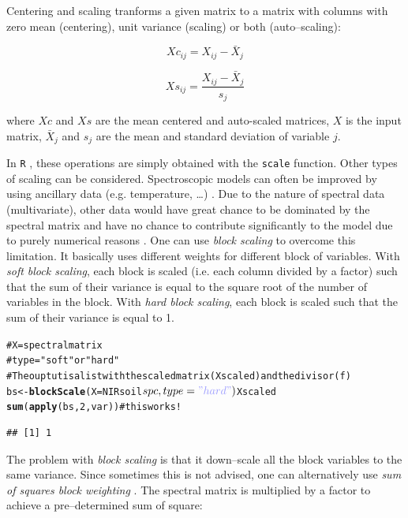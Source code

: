 \documentclass[12pt]{article}\usepackage{graphicx, color}
\makeatletter
\newcommand{\hlfunctioncall}[1]{\textcolor[rgb]{0.501960784313725,0,0.329411764705882}{\textbf{#1}}}%
\newcommand{\hlstring}[1]{\textcolor[rgb]{0.6,0.6,1}{#1}}%
\newcommand{\hlcomment}[1]{\textcolor[rgb]{0.180392156862745,0.6,0.341176470588235}{#1}}%
\newenvironment{kframe}{%
 \def\at@end@of@kframe{}%
 \ifinner\ifhmode%
  \def\at@end@of@kframe{\end{minipage}}%
  \begin{minipage}{\columnwidth}%
 \fi\fi%
 \def\FrameCommand##1{\hskip\@totalleftmargin \hskip-\fboxsep
 \colorbox{shadecolor}{##1}\hskip-\fboxsep
     \hskip-\linewidth \hskip-\@totalleftmargin \hskip\columnwidth}%
 \MakeFramed {\advance\hsize-\width
   \@totalleftmargin\z@ \linewidth\hsize
   \@setminipage}}%
 {\par\unskip\endMakeFramed%
 \at@end@of@kframe}
\newenvironment{knitrout}{}{} %
\newcommand{\R}{\texttt{R} }
\newcommand{\Rfunction}[1]{{\texttt{#1}}}
\makeatother
\begin{document}
Centering and scaling tranforms a given matrix to a matrix with columns with zero mean (centering), unit variance (scaling) or both (auto--scaling):

$$ Xc_{ij} = X_{ij}  - \bar{X}_{j} $$

$$ Xs_{ij} = \frac{X_{ij}  - \bar{X}_{j}}{s_{j}} $$

where $Xc$ and $Xs$ are the mean centered and auto-scaled matrices, $X$ is the input matrix, $\bar{X}_{j}$ and $s_{j}$ are the mean and standard deviation of variable $j$.

In \R, these operations are simply obtained with the \Rfunction{scale} function. Other types of scaling can be considered.  Spectroscopic models can often be improved by using ancillary data (e.g. temperature, \dots) \cite{fearn2010}. Due to the nature of spectral data (multivariate), other data would have great chance to be dominated by the spectral matrix and have no chance to contribute significantly to the model due to purely numerical reasons \cite{eriksson2006}. One can use \emph{block scaling} to overcome this limitation. It basically uses different weights for different block of variables. With \emph{soft block scaling}, each block is scaled (i.e. each column divided by a factor) such that the sum of their variance is equal to the square root of the number of variables in the block. With \emph{hard block scaling}, each block is scaled such that the sum of their variance is equal to 1.

\begin{knitrout}
\color{fgcolor}\begin{kframe}
\begin{alltt}
\hlcomment{# X = spectral matrix}
\hlcomment{# type = "soft" or "hard"}
\hlcomment{# The ouptut is a list with the scaled matrix (Xscaled) and the divisor (f)}
bs <- \hlfunctioncall{blockScale}(X=NIRsoil$spc,type=\hlstring{"hard"})$Xscaled
\hlfunctioncall{sum}(\hlfunctioncall{apply}(bs,2,var)) \hlcomment{# this works!}
\end{alltt}
\begin{verbatim}
## [1] 1
\end{verbatim}
\end{kframe}
\end{knitrout}


The problem with \emph{block scaling} is that it down--scale all the block variables to the same variance. Since sometimes this is not advised, one can alternatively use \emph{sum of squares block weighting} . The spectral matrix is multiplied by a factor to achieve a pre--determined sum of square: 
\end{document}

